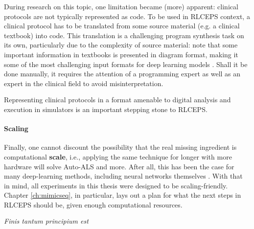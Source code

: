 During research on this topic, one limitation became (more) apparent: clinical protocols are not typically represented as code.
To be used in RLCEPS context, a clinical protocol has to be translated from some source material (e.g. a clinical textbook) into code.
This translation is a challenging program synthesis task on its own, particularly due to the complexity of source material: note that some important information in textbooks is presented in diagram format, making it some of the most challenging input formats for deep learning models \cite{hauriletMoQAMultimodalQuestion2019,heTextbookQuestionAnswering2021,jamiesonDeepLearningText2020,jamiesonReviewDeepLearning2024,novakDiagramsTextComputer1993,shiinokiOvercomingVisionLanguage2025}.
Shall it be done manually, it requires the attention of a programming expert as well as an expert in the clinical field to avoid misinterpretation.

Representing clinical protocols in a format amenable to digital analysis and execution in simulators is an important stepping stone to RLCEPS.

\paragraph{Scaling}

Finally, one cannot discount the possibility that the real missing ingredient is computational \textbf{scale}, i.e., applying the same technique for longer with more hardware will solve Auto-ALS and more.
After all, this has been the case for many deep-learning methods, including neural networks themselves \cite{schmidhuberAnnotatedHistoryModern2022}.
With that in mind, all experiments in this thesis were designed to be scaling-friendly.
Chapter \ref{ch:mimicseq}, in particular, lays out a plan for what the next steps in RLCEPS should be, given enough computational resources.

\clearpage
\thispagestyle{empty}
\vspace*{\fill}
\begin{center}
\emph{Finis tantum principium est}
\end{center}
\vspace*{\fill}
